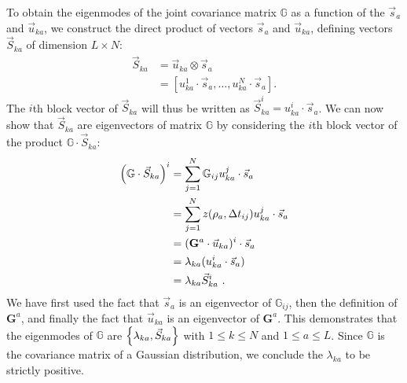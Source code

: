 \documentclass[preprint,amsmath,amssymb,superscriptaddress,showpacs,pre]{revtex4-1}
\let\originalleft\left
\let\originalright\right
\renewcommand{\left}{\mathopen{}\mathclose\bgroup\originalleft}
\renewcommand{\right}{\aftergroup\egroup\originalright}
\newcommand{\vsa}{\vec{s}_a}
\newcommand{\vuka}{\vec{u}_{ka}}
\begin{document}
To obtain the eigenmodes of the joint covariance matrix $\mathbb{G}$ as a function of the $\vsa$ and $\vuka$, we construct the direct product of vectors $\vsa$ and $\vuka$, defining vectors $\vec{S}_{ka}$ of dimension $L\times N$:
\begin{equation}
	\begin{split}
		\vec{S}_{ka} &= \vuka \otimes \vsa \\
		&= [u_{ka}^1\cdot\vsa, \ldots, u_{ka}^N\cdot\vsa].
	\end{split}
	\label{eq:Sdef}
\end{equation}
The $i$th block vector of $\vec{S}_{ka}$ will thus be written as $\vec{S}_{ka}^i = u_{ka}^i\cdot\vsa$. 
We can now show that $\vec{S}_{ka}$ are eigenvectors of matrix $\mathbb{G}$ by considering the $i$th block vector of the product $\mathbb{G}\cdot\vec{S}_{ka}$:
\begin{equation}
	\begin{split}
		\left(\mathbb{G}\cdot\vec{S}_{ka}\right)^i &= \sum_{j=1}^N \mathbb{G}_{ij} u_{ka}^j\cdot\vsa \\
		&= \sum_{j=1}^N z(\rho_a, \Delta t_{ij}) u_{ka}^j\cdot \vsa \\
		&= (\mathbf{G}^a\cdot\vuka)^i \cdot \vsa\\
		&= \lambda_{ka}(u_{ka}^i\cdot\vsa) \\
		&= \lambda_{ka}\vec{S}_{ka}^i \ .
	\end{split}
\end{equation}
We have first used the fact that $\vsa$ is an eigenvector of $\mathbb{G}_{ij}$, then the definition of ${\bm G}^a$, and finally the fact that $\vuka$ is an eigenvector of ${\bm G}^a$. 
This demonstrates that the eigenmodes of $\mathbb{G}$ are $\left\{ \lambda_{ka}, \vec{S}_{ka} \right\}$ with $1\leq k\leq N$ and $1\leq a \leq L$. 
Since $\mathbb{G}$ is the covariance matrix of a Gaussian distribution, we conclude the $\lambda_{ka}$ to be strictly positive.
\end{document}

